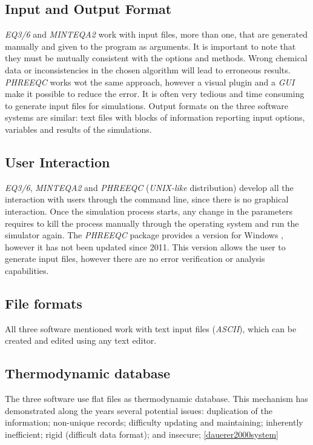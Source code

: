 \documentclass[preprint,12pt,3p]{elsarticle}
\begin{document}
\subsection{Input and Output Format}
\emph{EQ3/6} and \emph{MINTEQA2} work with input files, more than one, that are generated manually and given to the program as arguments. It is important to note that they must be mutually consistent with the options and methods. Wrong chemical data or inconsistencies in the chosen algorithm will lead to erroneous results. \emph{PHREEQC} works wot the same approach, however a visual plugin \cite{NotPhree:11} and a \emph{GUI} \cite{pfw:11} make it possible to reduce the error. It is often very tedious and time consuming to generate input files for simulations. Output formats on the three software systems are similar: text files with blocks of information reporting input options, variables and results of the simulations.

\subsection{User Interaction}
\emph{EQ3/6}, \emph{MINTEQA2} and \emph{PHREEQC} (\emph{UNIX-like} distribution) develop all the interaction with users through the command line, since there is no graphical interaction. Once the simulation process starts, any change in the parameters requires to kill the process manually through the operating system and run the simulator again. The \emph{PHREEQC} package provides a version for Windows \cite{pfw:11}, however it has not been updated since 2011. This version allows the user to generate input files, however there are no error verification or analysis capabilities.

\subsection{File formats}
All three software mentioned work with text input files (\emph{ASCII}), which can be created and edited using any text editor.

\subsection{Thermodynamic database}
The three software use flat files as thermodynamic database. This mechanism has demonstrated along the years several potential issues: duplication of the information; non-unique records; difficulty updating and maintaining; inherently inefficient; rigid (difficult data format); and insecure; \ref{dauerer2000system}
\end{document}
